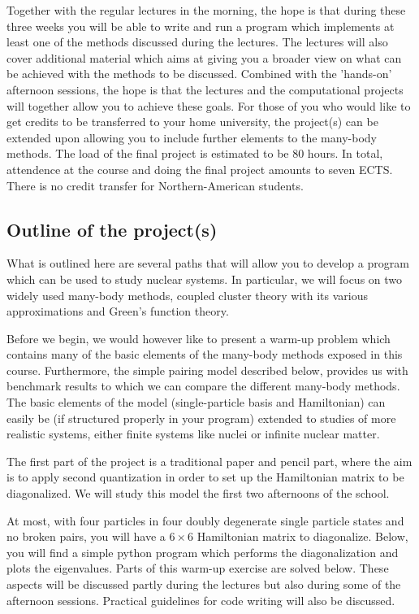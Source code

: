 \documentclass[%
twoside,                 %
final,                   %
10pt]{article}
\begin{document}
Together with the regular lectures in the morning, the hope is that
during these three weeks you will be able to write and run a program
which implements at least one of the methods discussed during the
lectures.  The lectures will also cover additional material which aims
at giving you a broader view on what can be achieved with the methods
to be discussed. Combined with the 'hands-on' afternoon sessions, the
hope is that the lectures and the computational projects will together
allow you to achieve these goals. For those of you who would like to
get credits to be transferred to your home university, the project(s)
can be extended upon allowing you to include further elements to the
many-body methods. The load of the final project is estimated to be 
80 hours. In total, attendence at the course and doing
the final project amounts to seven ECTS. There is no credit transfer
for Northern-American students.

\subsection*{Outline of the project(s)}

What is outlined here are several paths that will allow you to develop
a program which can be used to study nuclear systems. In particular,
we will focus on two widely used many-body methods, coupled cluster
theory with its various approximations and Green's function theory.

Before we begin, we would however like to present a warm-up problem which 
contains
many of the basic elements of the many-body methods exposed in this course. Furthermore, the simple pairing 
model described below, provides us with  benchmark results to which we can compare 
the different many-body methods. The basic elements of the model (single-particle basis and Hamiltonian)
can easily be (if structured properly in your program) extended to studies of more realistic systems, either 
finite systems like nuclei or infinite nuclear matter. 

The first part of the project is a traditional paper and pencil part, where the aim is to 
apply second quantization in order to set up the Hamiltonian matrix to be diagonalized.
We will study this model the first two afternoons of the school. 

At most, with four particles in four doubly degenerate single particle states and no broken pairs,
you will have a $6 \times 6$ Hamiltonian matrix to diagonalize. Below, you will find a simple python program
which performs the diagonalization and plots the eigenvalues. Parts of this warm-up exercise are solved below. 
These aspects will be discussed partly during the lectures but also during some of the afternoon sessions.
Practical guidelines for code writing will also be discussed.
\end{document}

